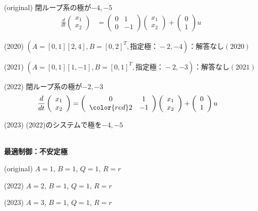 (original)
閉ループ系の極が$-4,-5$
\begin{align*}
	\frac{d}{dt}
	\left (
	\begin{array}{c}
	 x_1 \\ x_2 
	\end{array}
	\right )
	& = 
	\left (
	\begin{array}{cc}
	 0 & 1 \\
	 0 & -1
	\end{array}
	\right )
	\left (
	\begin{array}{c}
	 x_1 \\ x_2 
	\end{array}
	\right )
	+
	\left (
	\begin{array}{c}
	 0 \\ 1 
	\end{array}
	\right )
	u
\end{align*}

(2020) $(A=[0, 1][2, 4], B=[0, 2]^T, 指定極：-2,-4)：解答なし(2020) $

(2021) $(A=[0, 1][1, -1], B=[0, 1]^T, 指定極：-2,-3)：解答なし(2021)$

(2022)
閉ループ系の極が{\color{red}$-2,-3$}
\begin{align*}
	\frac{d}{dt}
	\left (
	\begin{array}{c}
	 x_1 \\ x_2 
	\end{array}
	\right )
	& = 
	\left (
	\begin{array}{cc}
	 0 & 1 \\
	 \color{red} 2 & -1
	\end{array}
	\right )
	\left (
	\begin{array}{c}
	 x_1 \\ x_2 
	\end{array}
	\right )
	+
	\left (
	\begin{array}{c}
	 0 \\ 1 
	\end{array}
	\right )
	u
\end{align*}

(2023) (2022)のシステムで極を{\color{red}$-4,-5$}



\ \\ \noindent
{\bf 最適制御：不安定極}

(original)
$A=1$, $B=1$, $Q=1$, $R=r$

(2022)
{\color{red}$A=2$}, $B=1$, $Q=1$, $R=r$

(2023)
{\color{red}$A=3$}, $B=1$, $Q=1$, $R=r$

